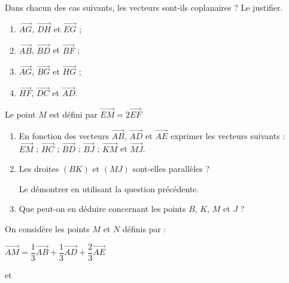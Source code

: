 \begin{colonne*exercice}
\columnbreak

\begin{exercice}
  Dans chacun des cas suivants, les vecteurs sont-ils coplanaires ? Le
  justifier.
  \begin{enumerate}
  \item $\overrightarrow{AG}$, $\overrightarrow{DH}$ et
    $\overrightarrow{EG}$ ;
  \item $\overrightarrow{AB}$, $\overrightarrow{BD}$ et
    $\overrightarrow{BF}$ ;
  \item $\overrightarrow{AG}$, $\overrightarrow{BG}$ et
    $\overrightarrow{HG}$ ;
  \item $\overrightarrow{HF}$, $\overrightarrow{DC}$ et
    $\overrightarrow{AD}$.
  \end{enumerate}
\end{exercice}

\begin{exercice}
  Le point $M$ est défini par
  $\overrightarrow{EM}=2\overrightarrow{EF}$
  \begin{enumerate}
  \item En fonction des vecteurs
    $\overrightarrow{AB}$, $\overrightarrow{AD}$ et
    $\overrightarrow{AE}$ exprimer les vecteurs suivants :
    \\$\overrightarrow{EM}$
    ; $\overrightarrow{HC}$
    ; $\overrightarrow{BD}$
    ; $\overrightarrow{BJ}$
    ; $\overrightarrow{KM}$ et $\overrightarrow{MJ}$.
  \item Les droites $(BK)$ et $(MJ)$ sont-elles parallèles ?

    Le démontrer en utilisant la question précédente.
  \item Que peut-on en déduire concernant les points $B$,
    $K$, $M$ et $J$ ?
  \end{enumerate}
\end{exercice}

\begin{exercice*}\label{ex37G2}
  On considère les points $M$ et $N$ définis par :

  $\overrightarrow{AM}=\dfrac{1}{3}\overrightarrow{AB}+\dfrac{1}{3}\overrightarrow{AD}+\dfrac{2}{3}\overrightarrow{AE}$

  et 


\end{exercice*}
\end{colonne*exercice}
